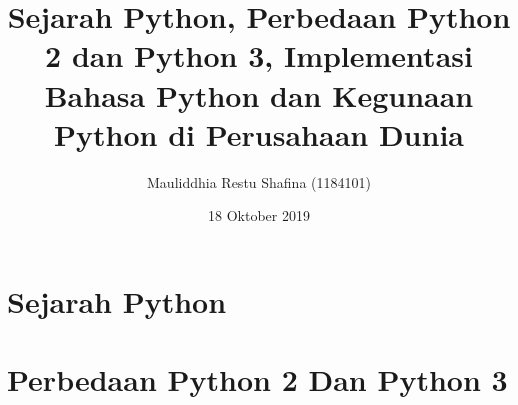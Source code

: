 \documentclass{article}
\title{Sejarah Python, Perbedaan Python 2 dan Python 3, Implementasi Bahasa Python dan Kegunaan Python di Perusahaan Dunia }
\author{Mauliddhia Restu Shafina (1184101) }
\date{18 Oktober 2019}
\begin{document}
\maketitle

\section{Sejarah Python}

\usepackage{Diciptakan oleh Guido van Rossum pada awal tahun 1990 di  Centrum Wiskunde & Informatica (CWI) Belanda. Berawal dari bahasa pemrograman ABC, yang sekarang bersifat open source sehingga ribuan orang juga bisa berkontribusi dalam perkembangannya. Dia merilis beberapa versi dari python pada tahun 1950 di Corporation for National Research Initiative (CNRI), Virginia Amerika. Guido van Rossum dan tim inti python berpindah ke BeOpen.com membentuk tim beOpen.com pythonLabs dan mengeluarkan python 2.0. Ditahun yang sama Guido van Rossum beserta tim inti python berpindah lagi ke Digital Creation.} 

\usepackage{Pada saat ini pengembangan Python terus dilakukan oleh sekumpulan pemrogram yang dikoordinir Guido dan Python Software Foundation. Organisasi Python Software Foundation adalah sebuah organisasi non-profit yang dibentuk sebagai pemegang hak cipta intelektual Python sejak versi 2.1 dan dengan demikian mencegah Python dimiliki oleh perusahaan komersial. Karena kecintaan guido pada acara televisi Monty Python's Flying Circus, Guido van Rossum memilih nama Python untuk dijadikan nama bahsa pemrograman yang dibuatnya.}

\section{Perbedaan Python 2 Dan Python 3}

\usepackage{Ada beberapa perbedaan, antara lain}

\usepackage{-	Ketika akan di print dengan menampilkan hello world. Perbedaan ini membuat sintaksis pada Python lebih konsisten. Dengan menggunakan  print()  juga kompatibel dengan Python 2.7. }

\usepackage{Contoh =}

\usepackage{Source code python 2 : print "Hello world, python"}

\usepackage{
Source code python 3 : print ("Hello world, python") }

\usepackage{
-	Pembagian pada integer. Python 2, semua tipe data angka tidak mengandung desimal akan di perlakukan sebagai integer. Dan jika kedua integer tersebut dibagi akan menghasilkan data float.}
\end{document}
